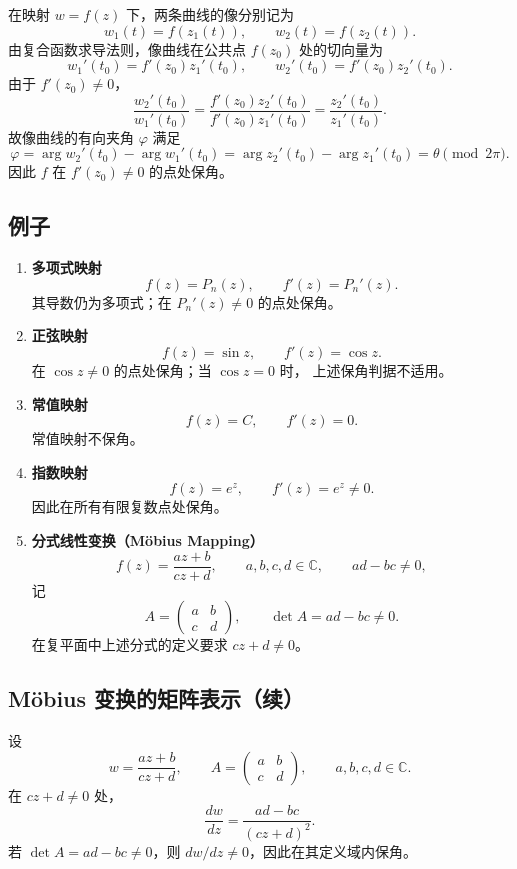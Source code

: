 在映射 $w=f(z)$ 下，两条曲线的像分别记为
\[
  w_1(t)=f(z_1(t)),\qquad w_2(t)=f(z_2(t)).
\]
由复合函数求导法则，像曲线在公共点 $f(z_0)$ 处的切向量为
\[
  w_1'(t_0)=f'(z_0)z_1'(t_0),\qquad
  w_2'(t_0)=f'(z_0)z_2'(t_0).
\]
由于 $f'(z_0)\ne0$，
\[
  \frac{w_2'(t_0)}{w_1'(t_0)}
  =\frac{f'(z_0)z_2'(t_0)}{f'(z_0)z_1'(t_0)}
  =\frac{z_2'(t_0)}{z_1'(t_0)}.
\]
故像曲线的有向夹角 $\varphi$ 满足
\[
  \varphi
  =\arg w_2'(t_0)-\arg w_1'(t_0)
  =\arg z_2'(t_0)-\arg z_1'(t_0)
  =\theta\pmod{2\pi}.
\]
因此 $f$ 在 $f'(z_0)\ne0$ 的点处保角。

\subsection*{例子}
\begin{enumerate}
  \item \textbf{多项式映射}
  \[
    f(z)=P_n(z),\qquad f'(z)=P_n'(z).
  \]
  其导数仍为多项式；在 $P_n'(z)\ne0$ 的点处保角。

  \item \textbf{正弦映射}
  \[
    f(z)=\sin z,\qquad f'(z)=\cos z.
  \]
  在 $\cos z\ne0$ 的点处保角；当 $\cos z=0$ 时，
  上述保角判据不适用。

  \item \textbf{常值映射}
  \[
    f(z)=C,\qquad f'(z)=0.
  \]
  常值映射不保角。

  \item \textbf{指数映射}
  \[
    f(z)=e^z,\qquad f'(z)=e^z\ne0.
  \]
  因此在所有有限复数点处保角。

  \item \textbf{分式线性变换（Möbius Mapping）}
  \[
    f(z)=\frac{az+b}{cz+d},\qquad
    a,b,c,d\in\mathbb C,\qquad ad-bc\ne0,
  \]
  记
  \[
    A=\begin{pmatrix}a&b\\c&d\end{pmatrix},
    \qquad \det A=ad-bc\ne0.
  \]
  在复平面中上述分式的定义要求 $cz+d\ne0$。
\end{enumerate}



\subsection*{Möbius 变换的矩阵表示（续）}
设
\[
  w=\frac{az+b}{cz+d},\qquad
  A=\begin{pmatrix}a&b\\c&d\end{pmatrix},
  \qquad a,b,c,d\in\mathbb C.
\]
在 $cz+d\ne0$ 处，
\[
  \frac{dw}{dz}=\frac{ad-bc}{(cz+d)^2}.
\]
若 $\det A=ad-bc\ne0$，则 $dw/dz\ne0$，因此在其定义域内保角。

